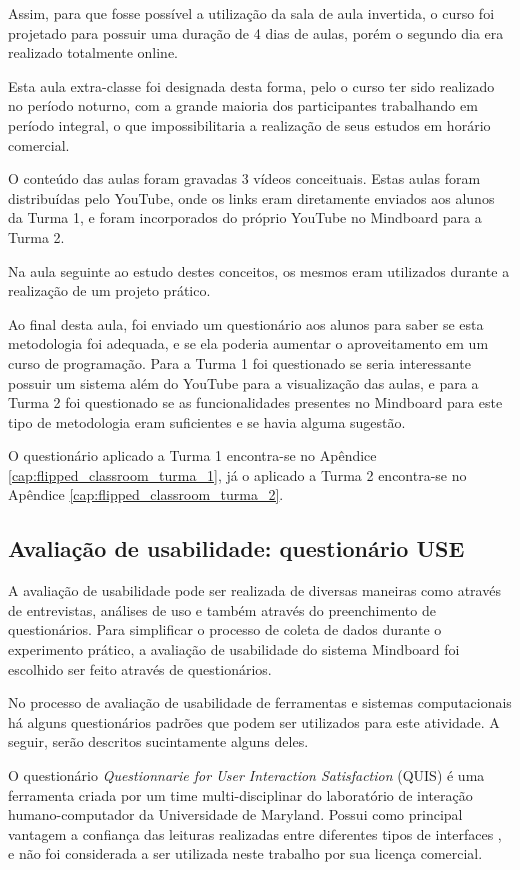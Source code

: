 Assim, para que fosse possível a utilização da sala de aula invertida, o curso foi projetado para possuir uma duração de 4 dias de aulas, porém o segundo dia era realizado totalmente online.

Esta aula extra-classe foi designada desta forma, pelo o curso ter sido realizado no período noturno, com a grande maioria dos participantes trabalhando em período integral, o que impossibilitaria a realização de seus estudos em horário comercial.

O conteúdo das aulas foram gravadas 3 vídeos conceituais. Estas aulas foram distribuídas pelo YouTube, onde os links eram diretamente enviados aos alunos da Turma 1, e foram incorporados do próprio YouTube no Mindboard para a Turma 2.

Na aula seguinte ao estudo destes conceitos, os mesmos eram utilizados durante a realização de um projeto prático.

Ao final desta aula, foi enviado um questionário aos alunos para saber se esta metodologia foi adequada, e se ela poderia aumentar o aproveitamento em um curso de programação. Para a Turma 1 foi questionado se seria interessante possuir um sistema além do YouTube para a visualização das aulas, e para a Turma 2 foi questionado se as funcionalidades presentes no Mindboard para este tipo de metodologia eram suficientes e se havia alguma sugestão.

O questionário aplicado a Turma 1 encontra-se no Apêndice \ref{cap:flipped_classroom_turma_1}, já o aplicado a Turma 2 encontra-se no Apêndice \ref{cap:flipped_classroom_turma_2}.

\subsection{Avaliação de usabilidade: questionário USE}

A avaliação de usabilidade pode ser realizada de diversas maneiras como através de entrevistas, análises de uso e também através do preenchimento de questionários. Para simplificar o processo de coleta de dados durante o experimento prático, a avaliação de usabilidade do sistema Mindboard foi escolhido ser feito através de questionários.

No processo de avaliação de usabilidade de ferramentas e sistemas computacionais há alguns questionários padrões que podem ser utilizados para este atividade. A seguir, serão descritos sucintamente alguns deles. 

O questionário \emph{Questionnarie for User Interaction Satisfaction} (QUIS) é uma ferramenta criada por um time multi-disciplinar do laboratório de interação humano-computador da Universidade de Maryland. Possui como principal vantagem a confiança das leituras realizadas entre diferentes tipos de interfaces \cite{quis}, e não foi considerada a ser utilizada neste trabalho por sua licença comercial.

